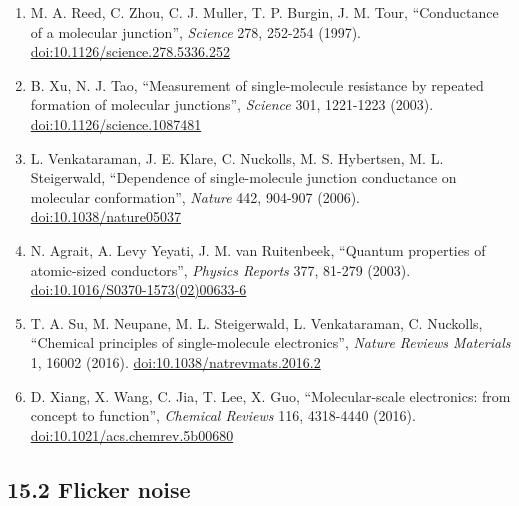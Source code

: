 \documentclass[
  11pt,
  a4paper,
]{article}
\providecommand{\tightlist}{%
  \setlength{\itemsep}{0pt}\setlength{\parskip}{0pt}}
\begin{document}
\begin{enumerate}
\def\labelenumi{\arabic{enumi}.}
\tightlist
\item
  M. A. Reed, C. Zhou, C. J. Muller, T. P. Burgin, J. M. Tour,
  ``Conductance of a molecular junction'', \emph{Science} 278, 252-254
  (1997).
  \href{https://doi.org/10.1126/science.278.5336.252}{doi:10.1126/science.278.5336.252}
\item
  B. Xu, N. J. Tao, ``Measurement of single-molecule resistance by
  repeated formation of molecular junctions'', \emph{Science} 301,
  1221-1223 (2003).
  \href{https://doi.org/10.1126/science.1087481}{doi:10.1126/science.1087481}
\item
  L. Venkataraman, J. E. Klare, C. Nuckolls, M. S. Hybertsen, M. L.
  Steigerwald, ``Dependence of single-molecule junction conductance on
  molecular conformation'', \emph{Nature} 442, 904-907 (2006).
  \href{https://doi.org/10.1038/nature05037}{doi:10.1038/nature05037}
\item
  N. Agrait, A. Levy Yeyati, J. M. van Ruitenbeek, ``Quantum properties
  of atomic-sized conductors'', \emph{Physics Reports} 377, 81-279
  (2003).
  \href{https://doi.org/10.1016/S0370-1573(02)00633-6}{doi:10.1016/S0370-1573(02)00633-6}
\item
  T. A. Su, M. Neupane, M. L. Steigerwald, L. Venkataraman, C. Nuckolls,
  ``Chemical principles of single-molecule electronics'', \emph{Nature
  Reviews Materials} 1, 16002 (2016).
  \href{https://doi.org/10.1038/natrevmats.2016.2}{doi:10.1038/natrevmats.2016.2}
\item
  D. Xiang, X. Wang, C. Jia, T. Lee, X. Guo, ``Molecular-scale
  electronics: from concept to function'', \emph{Chemical Reviews} 116,
  4318-4440 (2016).
  \href{https://doi.org/10.1021/acs.chemrev.5b00680}{doi:10.1021/acs.chemrev.5b00680}
\end{enumerate}

\hypertarget{flicker-noise}{%
\subsection{15.2 Flicker noise}\label{flicker-noise}}
\end{document}
